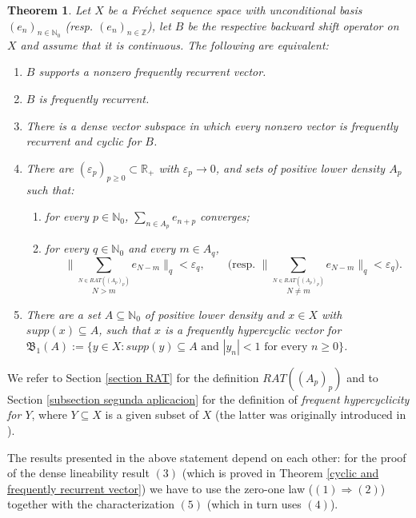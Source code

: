 \documentclass[11pt]{amsart}
\newtheorem{theorem}{Theorem}[section]
\newcommand{\sub}{\subseteq}
\begin{document}
\begin{theorem}\label{main theorem}
Let $X$ be a Fr\'echet sequence space with unconditional basis $(e_n)_{n\in \mathbb N_0}$ (resp. $(e_n)_{n\in \mathbb Z}$), let $B$ be the respective backward shift operator on $X$ and assume that it is continuous. 
 The following are equivalent:
\begin{enumerate}
    \item $B$ supports a nonzero frequently recurrent vector.
       \item $B$ is frequently recurrent.
    \item There is a dense vector subspace in which every nonzero vector is frequently recurrent and cyclic for $B$.
     \item  There are $(\varepsilon_p)_{p\ge 0}\subset \mathbb R_+$ with $\varepsilon_p\to 0$, and sets of positive lower density $A_p$  
     such that: 
\begin{enumerate}
    \item [i)]for every $p\in\mathbb N_0$, $\sum_{n\in A_p}e_{n+p}$ converges; 
    \item [ii)]
    for every $q\in\mathbb N_0$ and every  $m\in A_q$,
    $$
    \quad\Big\|\sum_{\overset{N\in RAT((A_p)_p)}{N>m}} e_{N-m}\Big\|_q<\varepsilon_q, \qquad \Big(\textrm{resp. } \Big\|\sum_{\overset{N\in RAT((A_p)_p)}{N\neq m}} e_{N-m}\Big\|_q<\varepsilon_q\Big).
    $$
        \end{enumerate}
   \item There are a set $A\subseteq \mathbb N_0$ of positive lower density and $x\in X$ with $supp(x)\subseteq A$, such that $x$ is a frequently hypercyclic vector for $\mathfrak B_1(A):=\{y\in X: supp(y)\subseteq A \text{ and } |y_n|<1 \text { for every } n\geq 0\}$. 
    
\end{enumerate}
\end{theorem}
We refer to Section \ref{section RAT} for the definition $RAT((A_p)_p)$ and to Section \ref{subsection segunda aplicacion} for the definition of \emph{frequent hypercyclicity for $Y$}, where $Y \sub X$ is a given subset of $X$ (the latter was originally introduced in \cite{Gro19bilateral}). 


The results presented in the above statement depend on each other: for the proof of the dense lineability result $(3)$  (which is proved in Theorem \ref{cyclic and frequently recurrent vector}) we have to use the zero-one law ($(1)\Rightarrow (2)$) together with  the  characterization $(5)$ (which in turn uses $(4)$). 
\end{document}
